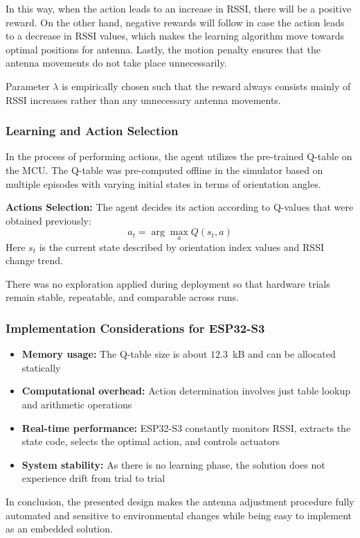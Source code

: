 In this way, when the action leads to an increase in RSSI, there will be a positive reward. On the other hand, negative rewards will follow in case the action leads to a decrease in RSSI values, which makes the learning algorithm move towards optimal positions for antenna. Lastly, the motion penalty ensures that the antenna movements do not take place unnecessarily.

Parameter $\lambda$ is empirically chosen such that the reward always consists mainly of RSSI increases rather than any unnecessary antenna movements.

\subsubsection{Learning and Action Selection}

In the process of performing actions, the agent utilizes the pre-trained Q-table 
on the MCU. The Q-table was pre-computed offline in the simulator based on multiple 
episodes with varying initial states in terms of orientation angles.

\textbf{Actions Selection:} 
The agent decides its action according to Q-values that were obtained previously:
\begin{equation}
a_t = \arg\max_a Q(s_t, a)
\end{equation}
Here $s_t$ is the current state described by orientation index values and RSSI change trend.

There was no exploration applied during deployment so that hardware trials remain stable,
repeatable, and comparable across runs.

\subsubsection{Implementation Considerations for ESP32-S3}

\begin{itemize}
    \item \textbf{Memory usage:} The Q-table size is about
    $12.3$~kB and can be allocated statically
    \item \textbf{Computational overhead:} Action determination involves just table
    lookup and arithmetic operations
    \item \textbf{Real-time performance:} ESP32-S3 constantly monitors RSSI, extracts
    the state code, selects the optimal action, and controls actuators
    \item \textbf{System stability:} As there is no learning phase, the solution does
    not experience drift from trial to trial
\end{itemize}

In conclusion, the presented design makes the antenna adjustment procedure fully automated and sensitive to environmental changes while being easy to implement as an embedded solution.